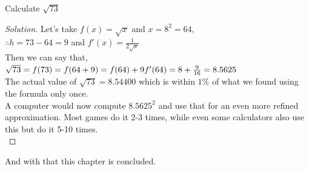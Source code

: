 \begin{example}
    Calculate $\sqrt{73}$
\end{example}
\begin{proof}
    [Solution]
    Let's take $f(x)=\sqrt{x}$ and $x=8^2=64$,\\
    $\therefore h=73-64=9$ and $f'(x)=\frac{1}{2\sqrt{x}}$\\
Then we can say that, \\
$\sqrt{73}=f(73)=f(64+9)=f(64)+9f'(64)=8+\frac{9}{16}\\
= 8.5625$\\
The actual value of $\sqrt{73}=8.54400$ which is within $1\%$ of what we found using the formula only once.\\
A computer would now compute $8.5625^2$ and use that for an even more refined approximation. Most games do it 2-3 times, while even some calculators also use this but do it 5-10 times.\\
\end{proof}
And with that this chapter is concluded. 
